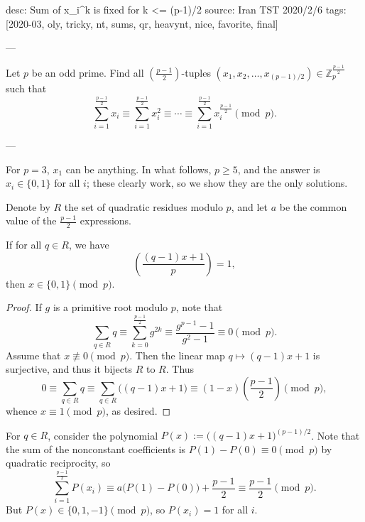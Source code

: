 desc: Sum of x_i^k is fixed for k <= (p-1)/2
source: Iran TST 2020/2/6
tags: [2020-03, oly, tricky, nt, sums, qr, heavynt, nice, favorite, final]

---

Let $p$ be an odd prime. Find all $\left(\tfrac{p-1}2\right)$-tuples $\left(x_1,x_2,\dots,x_{(p-1)/2}\right)\in\mathbb Z_p^{\frac{p-1}2}$ such that \[\sum_{i=1}^{\frac{p-1}2} x_i\equiv\sum_{i=1}^{\frac{p-1}2}x_i^2\equiv\cdots\equiv\sum_{i=1}^{\frac{p-1}2}x_i^{\frac{p-1}2}\pmod p.\]

---

For $p=3$, $x_1$ can be anything. In what follows, $p\ge5$, and the answer is $x_i\in\{0,1\}$ for all $i$; these clearly work, so we show they are the only solutions.

Denote by $R$ the set of quadratic residues modulo $p$, and let $a$ be the common value of the $\tfrac{p-1}2$ expressions.
\begin{lemma*}
    If for all $q\in R$, we have \[\left(\frac{(q-1)x+1}p\right)=1,\]
    then $x\in\{0,1\}\pmod p$.
\end{lemma*}
\begin{proof}
    If $g$ is a primitive root modulo $p$, note that \[\sum_{q\in R}q\equiv\sum_{k=0}^{\frac{p-1}2}g^{2k}\equiv\frac{g^{p-1}-1}{g^2-1}\equiv0\pmod p.\]
    Assume that $x\not\equiv0\pmod p$. Then the linear map $q\mapsto(q-1)x+1$ is surjective, and thus it bijects $R$ to $R$. Thus \[0\equiv\sum_{q\in R}q\equiv\sum_{q\in R}\big((q-1)x+1\big)\equiv(1-x)\left(\frac{p-1}2\right)\pmod p,\]
    whence $x\equiv1\pmod p$, as desired.
\end{proof}

For $q\in R$, consider the polynomial $P(x):=\big( (q-1)x+1\big)^{(p-1)/2}$. Note that the sum of the nonconstant coefficients is $P(1)-P(0)\equiv0\pmod p$ by quadratic reciprocity, so \[\sum_{i=1}^{\frac{p-1}2}P(x_i)\equiv a\big(P(1)-P(0)\big)+\frac{p-1}2\equiv\frac{p-1}2\pmod p.\]
But $P(x)\in\{0,1,-1\}\pmod p$, so $P(x_i)=1$ for all $i$.

